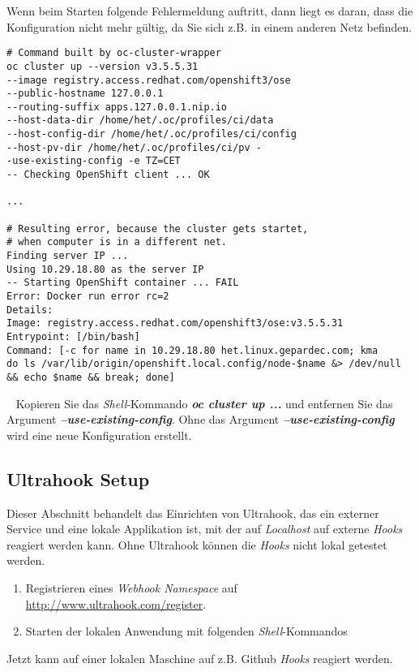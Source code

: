 Wenn beim Starten folgende Fehlermeldung auftritt, dann liegt es daran, dass die Konfiguration nicht mehr gültig, da Sie sich z.B. in einem anderen Netz befinden.
\begin{verbatim}
# Command built by oc-cluster-wrapper
oc cluster up --version v3.5.5.31 
--image registry.access.redhat.com/openshift3/ose 
--public-hostname 127.0.0.1 
--routing-suffix apps.127.0.0.1.nip.io 
--host-data-dir /home/het/.oc/profiles/ci/data 
--host-config-dir /home/het/.oc/profiles/ci/config 
--host-pv-dir /home/het/.oc/profiles/ci/pv -
-use-existing-config -e TZ=CET                                                                                                 
-- Checking OpenShift client ... OK   

...

# Resulting error, because the cluster gets startet, 
# when computer is in a different net.
Finding server IP ... 
Using 10.29.18.80 as the server IP
-- Starting OpenShift container ... FAIL
Error: Docker run error rc=2
Details:
Image: registry.access.redhat.com/openshift3/ose:v3.5.5.31
Entrypoint: [/bin/bash]
Command: [-c for name in 10.29.18.80 het.linux.gepardec.com; kma
do ls /var/lib/origin/openshift.local.config/node-$name &> /dev/null 
&& echo $name && break; done]
\end{verbatim}
\ \newline
Kopieren Sie das \emph{Shell}-Kommando \textbf{\emph{oc cluster up ...}} und entfernen Sie das Argument \textbf{\emph{--use-existing-config}}. Ohne das Argument \textbf{\emph{--use-existing-config}} wird eine neue Konfiguration erstellt.

\subsection{Ultrahook Setup}
Dieser Abschnitt behandelt das Einrichten von Ultrahook, das ein externer Service und eine lokale Applikation ist, mit der auf \emph{Localhost} auf externe \emph{Hooks} reagiert werden kann. Ohne Ultrahook können die \emph{Hooks} nicht lokal getestet werden.

\begin{enumerate}
	\item Registrieren eines \emph{Webhook Namespace} auf \url{http://www.ultrahook.com/register}.
	\item Starten der lokalen Anwendung mit folgenden \emph{Shell}-Kommandos\\
\end{enumerate}
Jetzt kann auf einer lokalen Maschine auf z.B. Github \emph{Hooks} reagiert werden.